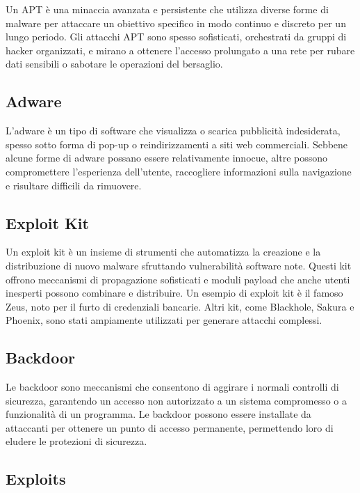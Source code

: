 Un APT è una minaccia avanzata e persistente che utilizza diverse forme di malware per attaccare un obiettivo specifico in modo continuo e discreto per un lungo periodo. Gli attacchi APT sono spesso sofisticati, orchestrati da gruppi di hacker organizzati, e mirano a ottenere l'accesso prolungato a una rete per rubare dati sensibili o sabotare le operazioni del bersaglio.

\subsection{Adware}

L'adware è un tipo di software che visualizza o scarica pubblicità indesiderata, spesso sotto forma di pop-up o reindirizzamenti a siti web commerciali. Sebbene alcune forme di adware possano essere relativamente innocue, altre possono compromettere l'esperienza dell'utente, raccogliere informazioni sulla navigazione e risultare difficili da rimuovere.

\subsection{Exploit Kit}

Un exploit kit è un insieme di strumenti che automatizza la creazione e la distribuzione di nuovo malware sfruttando vulnerabilità software note. Questi kit offrono meccanismi di propagazione sofisticati e moduli payload che anche utenti inesperti possono combinare e distribuire. Un esempio di exploit kit è il famoso Zeus, noto per il furto di credenziali bancarie. Altri kit, come Blackhole, Sakura e Phoenix, sono stati ampiamente utilizzati per generare attacchi complessi.

\subsection{Backdoor}

Le backdoor sono meccanismi che consentono di aggirare i normali controlli di sicurezza, garantendo un accesso non autorizzato a un sistema compromesso o a funzionalità di un programma. Le backdoor possono essere installate da attaccanti per ottenere un punto di accesso permanente, permettendo loro di eludere le protezioni di sicurezza.

\subsection{Exploits}


